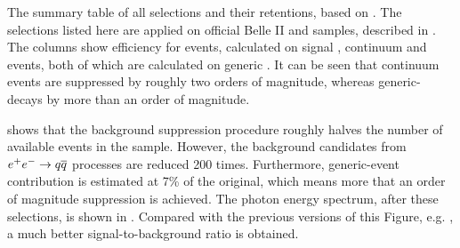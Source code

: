 \begin{table}[htbp!]
    \centering
    \caption{\label{tab:cutflow} The summary table of all selections and their retentions, based on .
    The selections listed here are applied on official Belle II \feiBp and \feiBz samples, described in .
    The columns show efficiency for \BtoXsgamma events, calculated on signal \MC, continuum and \BB events, both of which are calculated on generic \MC.
    It can be seen that continuum events are suppressed by roughly two orders of magnitude, whereas generic-\BB decays by more than an order of magnitude.
    }
    
\end{table}

 shows that the background suppression procedure roughly halves the number of available \BtoXsgamma events in the sample.
However, the background candidates from \mbox{$e^+e^-\rightarrow q\overline q$} processes are reduced 200 times.
Furthermore, generic-\BB event contribution is estimated at 7\% of the original, which means more that an order of magnitude suppression is achieved.
The photon energy spectrum, after these selections, is shown in .
Compared with the previous versions of this Figure, e.g. , a much better signal-to-background ratio is obtained.

